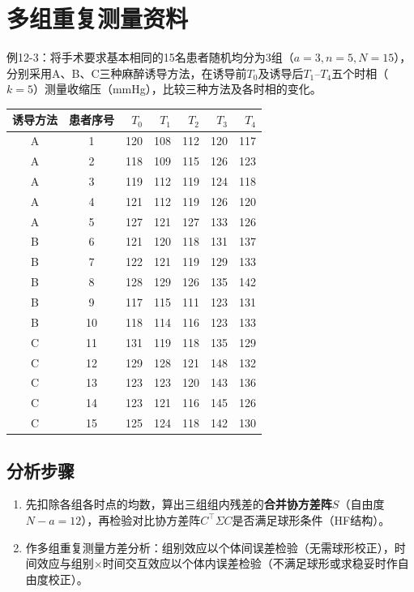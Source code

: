 \section{多组重复测量资料}
例12-3：将手术要求基本相同的15名患者随机均分为3组（$a=3,n=5,N=15$），分别采用A、B、C三种麻醉诱导方法，在诱导前$T_0$及诱导后$T_1$--$T_4$五个时相（$k=5$）测量收缩压（mmHg），比较三种方法及各时相的变化。
\par\noindent\begin{minipage}{\linewidth}
\begin{center}\small\begin{tabular}{ccrrrrr}
\toprule 诱导方法&患者序号&$T_0$&$T_1$&$T_2$&$T_3$&$T_4$\\\midrule
A&1&120&108&112&120&117\\A&2&118&109&115&126&123\\
A&3&119&112&119&124&118\\A&4&121&112&119&126&120\\A&5&127&121&127&133&126\\\midrule
B&6&121&120&118&131&137\\B&7&122&121&119&129&133\\B&8&128&129&126&135&142\\
B&9&117&115&111&123&131\\B&10&118&114&116&123&133\\\midrule
C&11&131&119&118&135&129\\C&12&129&128&121&148&132\\C&13&123&123&120&143&136\\
C&14&123&121&116&145&126\\C&15&125&124&118&142&130\\\bottomrule
\end{tabular}\end{center}
\end{minipage}\par\medskip

\subsection{分析步骤}
\begin{enumerate}
\item 先扣除各组各时点的均数，算出三组组内残差的\textbf{合并协方差阵}$S$（自由度$N-a=12$），再检验对比协方差阵$C^\top\Sigma C$是否满足球形条件（HF结构）。
\item 作多组重复测量方差分析：组别效应以个体间误差检验（无需球形校正），时间效应与组别$\times$时间交互效应以个体内误差检验（不满足球形或求稳妥时作自由度校正）。
\end{enumerate}


